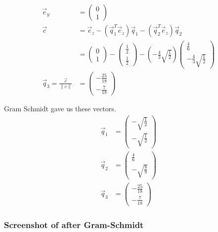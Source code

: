 \documentclass[a4paper]{article}
\begin{document}
\begin{PropositionOpt4}
\begin{displaymath}
\begin{align}
\vec{e}_{y} &= \begin{pmatrix}0\\1\end{pmatrix}\\
\vec{c} &= \vec{e}_{z} - (\vec{q}_{1}^{T}\vec{e}_{z})\vec{q}_{1} - (\vec{q}_{2}^{T}\vec{e}_{z})\vec{q}_{2}\\
			&= \begin{pmatrix}0\\1\end{pmatrix} - \begin{pmatrix}\frac12\\\frac12\end{pmatrix}-(-\frac43\sqrt{\frac12})\begin{pmatrix}\frac46\\-\frac43\sqrt{\frac12}\end{pmatrix}\\
\vec{q}_{3} = \frac{\vec{c}}{\|c\|}
			&= \begin{pmatrix}-\frac{25}{18}\\-\frac{7}{18}\end{pmatrix}
\end{align}
\end{displaymath}

Gram Schmidt gave us these vectors.
\begin{displaymath}
\begin{align}
\vec{q}_{1} &=  \begin{pmatrix}-\sqrt{\frac12}\\-\sqrt{\frac12}\end{pmatrix}\\
\vec{q}_{2} &= \begin{pmatrix}\frac46\\-\sqrt{\frac{8}{9}}\end{pmatrix}\\
\vec{q}_{3} &= \begin{pmatrix}-\frac{25}{18}\\-\frac{7}{18}\end{pmatrix}
\end{align}
\end{displaymath}



\subsubsection{Screenshot of after Gram-Schmidt}


\end{PropositionOpt4}
\end{document}
